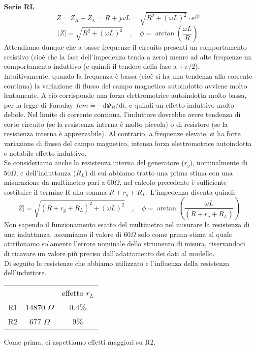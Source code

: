 \textbf{Serie RL}
$$ Z = Z_R + Z_L = R + j\omega L = \sqrt{R^2+(\omega L)^2} \cdot{} e^{j\phi} $$
$$ |Z| = \sqrt{R^2+(\omega L)^2} \quad , \quad \phi = \arctan \left( \frac{\omega L}{R}\right) $$
Attendiamo dunque che a basse frequenze il circuito presenti un comportamento resistivo (cioè che la fase dell'impedenza tenda a zero) menre ad alte frequenze un comportamento induttivo (e quindi il tendere della fase a $+\pi/2$).\\
Intuitivamente, quando la frequenza è bassa (cioè si ha una tendenza alla corrente continua) la variazione di flusso del campo magnetico autoindotto avviene molto lentamente. A ciò corrisponde una forza elettromotrice autoindotta molto bassa, per la legge di Faraday $fem = -\mathrm{d}\Phi_B/\mathrm{d}t$, e quindi un effetto induttivo molto debole. Nel limite di corrente continua, l'induttore dovrebbe avere tendenza di corto circuito (se la resistenza interna è molto piccola) o di resistore (se la resistenza interna è apprezzabile). Al contrario, a frequenze elevate, si ha forte variazione di flusso del campo magnetico, intensa forza elettromotrice autoindotta e notabile effetto induttivo.\\
%
Se consideriamo anche la resistenza interna del generatore ($r_g$), nominalmente di $50 \Omega$, e dell'induttanza ($R_L$) di cui abbiamo tratto una prima stima con una misurazione da multimetro pari a $60 \Omega$, nel calcolo precedente è sufficiente sostituire il termine R alla somma $R + r_g + R_L$. L'impedenza diventa quindi:
$$ |Z| = \sqrt{(R + r_g + R_L)^2+(\omega L)^2} \quad , \quad \phi = \arctan \left( \frac{\omega L}{(R + r_g + R_L)}\right) $$
Non sapendo il funzionamento esatto del multimetro nel misurare la resistenza di una induttanza, assumiamo il valore di $60 \Omega$ solo come prima stima al quale attribuiamo solamente l'errore nominale dello strumento di misura, riservandoci di ricavare un valore più preciso dall'adattamento dei dati al modello.\\

Di seguito le resistenze che abbiamo utilizzato e l'influenza della resistenza dell'induttore.
\begin{center}
    \begin{tabular}{|c c c|}\hline
            &                   & effetto $r_L$  \\
         R1 & 14870 $\Omega$    & 0.4\%      \\
         R2 & 677 $\Omega$      & 9\%   \\\hline
    \end{tabular}
    \label{tab:C3_P1_effetto_rL}
\end{center}
Come prima, ci aspettiamo effetti maggiori su R2.\\\\
%
%
